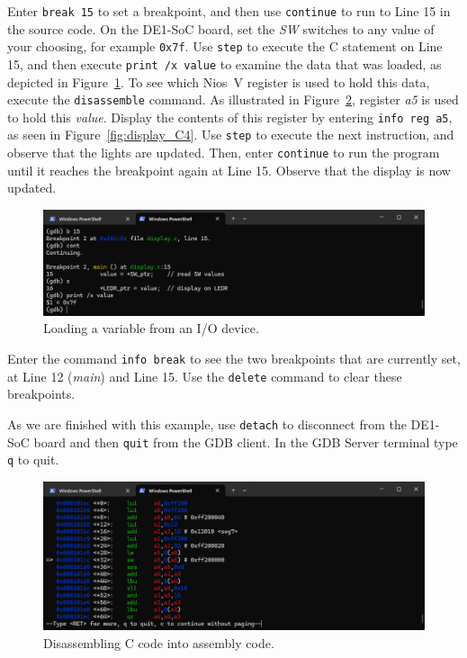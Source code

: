 \documentclass[11pt, twoside, pdftex]{article}
\newcommand{\red}[1]{{\color{red}\sf{#1}}}
\begin{document}
Enter \texttt{break 15} to set a breakpoint, and then use \texttt{continue} to run to 
Line 15 in the source code. On the DE1-SoC board, set the {\it SW} switches to any value of
your choosing, for example \texttt{0x7f}. Use \texttt{step} to execute the C statement on
Line 15, and then execute \texttt{print /x value} to examine the data that was loaded, as 
depicted in Figure~\ref{fig:display_C2}. To see which Nios~V register is used to hold
this data, execute the \texttt{disassemble} command. As illustrated in 
Figure~\ref{fig:display_C3}, register {\it a5} is used to hold this {\it value}. Display
the contents of this register by entering \texttt{info reg a5}, as seen in 
Figure~\ref{fig:display_C4}. Use \texttt{step} to execute the next instruction, and
observe that the \red{\it LEDR} lights are updated. Then, enter \texttt{continue} to run
the program until it reaches the breakpoint again at Line 15. Observe that the 
\red{\it HEX0} display is now updated.
~\\
\begin{figure}[H]
    \begin{center}
        \includegraphics[scale=.6]{figures/display_C2.png}
        \caption{Loading a variable from an I/O device.}
        \label{fig:display_C2}
    \end{center}
\end{figure}

Enter the command \texttt{info break} to see the two breakpoints that are currently set,
at Line 12 ({\it main}) and Line 15. Use the \texttt{delete} command to clear these
breakpoints. 

As we are finished with this example, use \texttt{detach} to disconnect from the DE1-SoC 
board and then \texttt{quit} from the GDB client. In the GDB Server terminal type 
\texttt{q} to quit.

\begin{figure}[H]
    \begin{center}
        \includegraphics[scale=.6]{figures/display_C3.png}
        \caption{Disassembling C code into assembly code.}
        \label{fig:display_C3}
    \end{center}
\end{figure}
\end{document}
